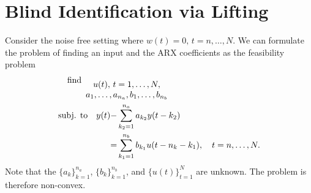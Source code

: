 \documentclass{ifacconf}
\renewcommand{\b}{{ b}}
\newcommand{\0}{{\bf 0}}
\renewcommand{\a}{a}
\def\subjto{{\mbox{subj. to}}}
\begin{document}
\section{Blind Identification via Lifting}




Consider the noise free setting where $w(t)=0, \,t=n,\dots,N.$
We can formulate the problem of finding an input and the ARX coefficients as the feasibility problem
\begin{subequations}\label{eq:probform}
\begin{align}\label{eq:probform1}
& \hspace*{-2.05cm}\text{find}_{\begin{array}{cc}u(t),\,t=1,\dots,N,\\ \a_1,\dots,
\a_{n_a}, \b_1,\dots, \b_{n_b} \end{array}}  \quad  
\\  \hspace{0cm} \nonumber
  \subjto   \quad y(t)-&\sum_{k_2=1}^{n_a}\a_{k_2} y(t-k_2)
  \\   \label{eq:probform2}  =& \sum_{k_1=1}^{n_b} 
\b_{k_1} u(t-n_k - k_1), \quad  t=n,\dots,N.
\end{align}\end{subequations}Note that the 
$\{
\a_k\}_{k=1}^{n_a}$, $\{ \b_k\}_{k=1}^{n_b}$,  and  $ \{
u(t)\}_{t=1}^N $ are unknown. The problem is therefore non-convex. 
\end{document}

